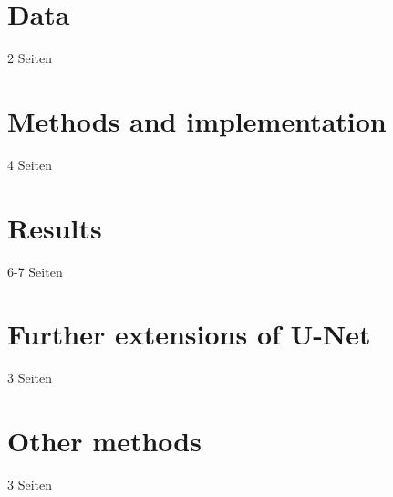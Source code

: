 \documentclass[12pt]{article}
\begin{document}
\section{Data}
2 Seiten
\newpage

\section{Methods and implementation}
4 Seiten
\newpage

\section{Results}
6-7 Seiten
\newpage

\section{Further extensions of U-Net}
3 Seiten
\newpage

\section{Other methods}
3 Seiten
\newpage


\newpage
\printbibliography
\end{document}
